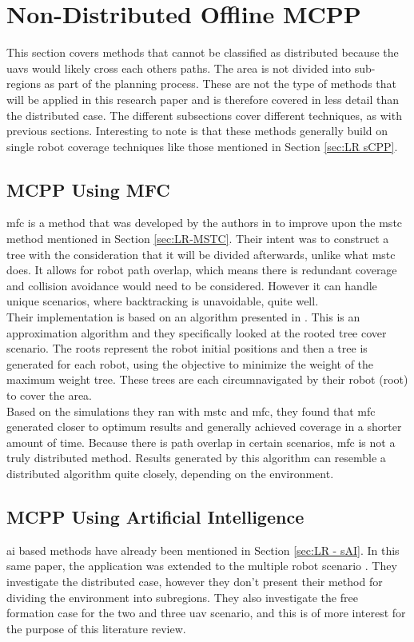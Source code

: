 \section{Non-Distributed Offline MCPP}
\label{sec:LR Non-Distributed MCPP}
This section covers methods that cannot be classified as distributed because the \acp{uav} would likely cross each others paths. The area is not divided into sub-regions as part of the planning process. These are not the type of methods that will be applied in this research paper and is therefore covered in less detail than the distributed case. The different subsections cover different techniques, as with previous sections. Interesting to note is that these methods generally build on single robot coverage techniques like those mentioned in Section \ref{sec:LR sCPP}.
\subsection{MCPP Using MFC}
\label{sec:LR MFC}
\ac{mfc} is a method that was developed by the authors in \cite{Zheng2005} to improve upon the \ac{mstc} method mentioned in Section \ref{sec:LR-MSTC}. Their intent was to construct a tree with the consideration that it will be divided afterwards, unlike what \ac{mstc} does. It allows for robot path overlap, which means there is redundant coverage and collision avoidance would need to be considered. However it can handle unique scenarios, where backtracking is unavoidable, quite well.\\ 
Their implementation is based on an algorithm presented in \cite{Even2003}. This is an approximation algorithm and they specifically looked at the rooted tree cover scenario. The roots represent the robot initial positions and then a tree is generated for each robot, using the objective to minimize the weight of the maximum weight tree. These trees are each circumnavigated by their robot (root) to cover the area.\\
Based on the simulations they ran with \ac{mstc} and \ac{mfc}, they found that \ac{mfc} generated closer to optimum results and generally achieved coverage in a shorter amount of time.	Because there is path overlap in certain scenarios, \ac{mfc} is not a truly distributed method. Results generated by this algorithm can resemble a distributed algorithm quite closely, depending on the environment.
\subsection{MCPP Using Artificial Intelligence}
\label{sec:LR-mAI}
\acl{ai} based methods have already been mentioned in Section \ref{sec:LR - sAI}. In this same paper, the application was extended to the multiple robot scenario \cite{Juan2018}. They investigate the distributed case, however they don't present their method for dividing the environment into subregions. They also investigate the free formation case for the two and three \ac{uav} scenario, and this is of more interest for the purpose of this literature review.

